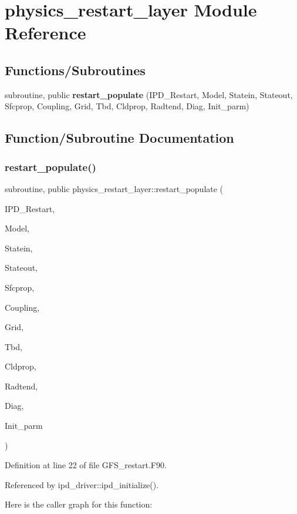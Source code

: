 \section{physics\+\_\+restart\+\_\+layer Module Reference}
\label{namespacephysics__restart__layer}
\subsection*{Functions/\+Subroutines}
\begin{DoxyCompactItemize}
\item 
subroutine, public \textbf{ restart\+\_\+populate} (I\+P\+D\+\_\+\+Restart, Model, Statein, Stateout, Sfcprop, Coupling, Grid, Tbd, Cldprop, Radtend, Diag, Init\+\_\+parm)
\end{DoxyCompactItemize}


\subsection{Function/\+Subroutine Documentation}
\mbox{\label{namespacephysics__restart__layer_a7e825843fe692e7de340c2ba922847cd}} 
\subsubsection{restart\+\_\+populate()}
{\footnotesize\ttfamily subroutine, public physics\+\_\+restart\+\_\+layer\+::restart\+\_\+populate (\begin{DoxyParamCaption}\item[{type(ipd\+\_\+restart\+\_\+type), intent(inout)}]{I\+P\+D\+\_\+\+Restart,  }\item[{type(control\+\_\+type), intent(in)}]{Model,  }\item[{type(statein\+\_\+type), dimension(\+:), intent(in)}]{Statein,  }\item[{type(stateout\+\_\+type), dimension(\+:), intent(in)}]{Stateout,  }\item[{type(sfcprop\+\_\+type), dimension(\+:), intent(in)}]{Sfcprop,  }\item[{type(coupling\+\_\+type), dimension(\+:), intent(in)}]{Coupling,  }\item[{type(grid\+\_\+type), dimension(\+:), intent(in)}]{Grid,  }\item[{type(tbd\+\_\+type), dimension(\+:), intent(in)}]{Tbd,  }\item[{type(cldprop\+\_\+type), dimension(\+:), intent(in)}]{Cldprop,  }\item[{type(radtend\+\_\+type), dimension(\+:), intent(in)}]{Radtend,  }\item[{type(intdiag\+\_\+type), dimension(\+:), intent(in)}]{Diag,  }\item[{type(init\+\_\+type), intent(in)}]{Init\+\_\+parm }\end{DoxyParamCaption})}



Definition at line 22 of file G\+F\+S\+\_\+restart.\+F90.



Referenced by ipd\+\_\+driver\+::ipd\+\_\+initialize().

Here is the caller graph for this function\+:
